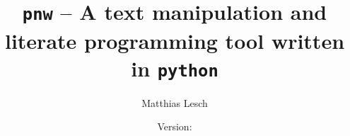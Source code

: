 \documentclass[neutral,proc,reqno]{ml-gen}
\begin{document}
\lstset{%
language=Python,
basicstyle=\small,
columns=fullflexible}

\title[\texttt{pnw}]{\texttt{pnw} -- A text manipulation and literate
programming tool written in \texttt{python}}

\author{Matthias Lesch}
\address{Mathematisches Institut,
Universit\"at Bonn,
Endenicher Allee 60,
53115 Bonn,
Germany}

%


\date{Version: }
\end{document}
